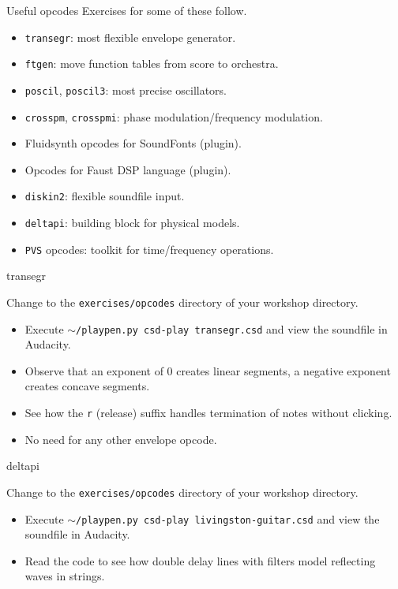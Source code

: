\documentclass{beamer}
\begin{document}
\begin{frame}{Useful opcodes}
Exercises for some of these follow.
\begin{itemize}
\item \texttt{transegr}: most flexible envelope generator.
\item \texttt{ftgen}: move function tables from score to orchestra.
\item \texttt{poscil}, \texttt{poscil3}: most precise oscillators.
\item \texttt{crosspm}, \texttt{crosspmi}: phase modulation/frequency modulation.
\item Fluidsynth opcodes for SoundFonts (plugin).
\item Opcodes for Faust DSP language (plugin).
\item \texttt{diskin2}: flexible soundfile input.
\item \texttt{deltapi}: building block for physical models.
\item \texttt{PVS} opcodes: toolkit for time/frequency operations.
\end{itemize}
\end{frame}

\begin{frame}{transegr}
\begin{example}
Change to the \texttt{exercises/opcodes} directory of your workshop directory.
\begin{itemize}
\item Execute \texttt{$\sim$/playpen.py csd-play transegr.csd} and view the soundfile in Audacity.
\end{itemize}
\end{example}
\begin{itemize}
\item Observe that an exponent of 0 creates linear segments, a negative exponent creates concave segments.
\item See how the \texttt{r} (release) suffix handles termination of notes without clicking.
\item No need for any other envelope opcode.
\end{itemize}
\end{frame}

\begin{frame}{deltapi}
\begin{example}
Change to the \texttt{exercises/opcodes} directory of your workshop directory.
\begin{itemize}
\item Execute \texttt{$\sim$/playpen.py csd-play livingston-guitar.csd} and view the soundfile in Audacity.
\item Read the code to see how double delay lines with filters model reflecting waves in strings.
\end{itemize}
\end{example}
\end{frame}
\end{document}
